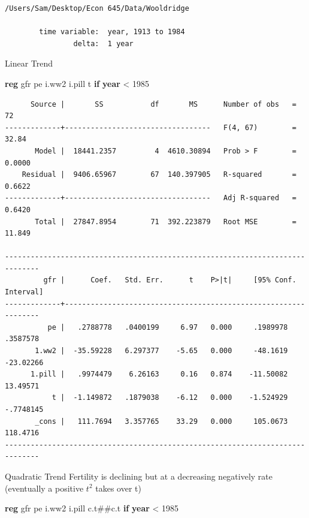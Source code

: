 \documentclass[
]{book}
\newenvironment{Shaded}{\begin{snugshade}}{\end{snugshade}}
\newcommand{\FunctionTok}[1]{\textcolor[rgb]{0.13,0.29,0.53}{\textbf{#1}}}
\newcommand{\KeywordTok}[1]{\textcolor[rgb]{0.13,0.29,0.53}{\textbf{#1}}}
\newcommand{\NormalTok}[1]{#1}
\begin{document}
\begin{verbatim}
/Users/Sam/Desktop/Econ 645/Data/Wooldridge

        time variable:  year, 1913 to 1984
                delta:  1 year
\end{verbatim}

Linear Trend

\begin{Shaded}
\begin{Highlighting}[]
\KeywordTok{reg}\NormalTok{ gfr pe i.ww2 i.pill t }\KeywordTok{if} \FunctionTok{year}\NormalTok{ \textless{} 1985}
\end{Highlighting}
\end{Shaded}

\begin{verbatim}
      Source |       SS           df       MS      Number of obs   =        72
-------------+----------------------------------   F(4, 67)        =     32.84
       Model |  18441.2357         4  4610.30894   Prob > F        =    0.0000
    Residual |  9406.65967        67  140.397905   R-squared       =    0.6622
-------------+----------------------------------   Adj R-squared   =    0.6420
       Total |  27847.8954        71  392.223879   Root MSE        =    11.849

------------------------------------------------------------------------------
         gfr |      Coef.   Std. Err.      t    P>|t|     [95% Conf. Interval]
-------------+----------------------------------------------------------------
          pe |   .2788778   .0400199     6.97   0.000     .1989978    .3587578
       1.ww2 |  -35.59228   6.297377    -5.65   0.000     -48.1619   -23.02266
      1.pill |   .9974479    6.26163     0.16   0.874    -11.50082    13.49571
           t |  -1.149872   .1879038    -6.12   0.000    -1.524929   -.7748145
       _cons |   111.7694   3.357765    33.29   0.000     105.0673    118.4716
------------------------------------------------------------------------------
\end{verbatim}

Quadratic Trend
Fertility is declining but at a decreasing negatively rate (eventually a positive \(t^2\) takes over t)

\begin{Shaded}
\begin{Highlighting}[]
\KeywordTok{reg}\NormalTok{ gfr pe i.ww2 i.pill c.t\#\#c.t }\KeywordTok{if} \FunctionTok{year}\NormalTok{ \textless{} 1985}
\end{Highlighting}
\end{Shaded}
\end{document}
